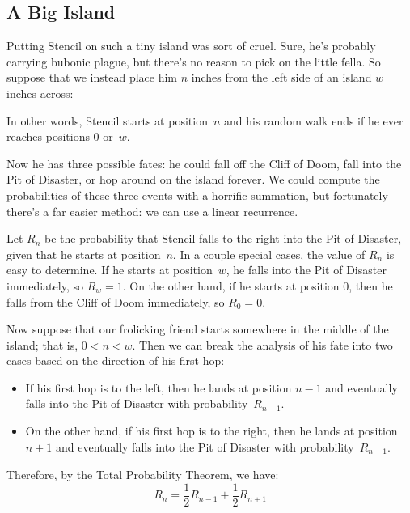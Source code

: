 \subsection{A Big Island}\label{sec:flea_analysis}

Putting Stencil on such a tiny island was sort of cruel.  Sure, he's
probably carrying bubonic plague, but there's no reason to pick on the
little fella.  So suppose that we instead place him $n$ inches from
the left side of an island $w$ inches across:
%
\begin{figure}[h]


\end{figure}
%
In other words, Stencil starts at position~$n$ and his random walk
ends if he ever reaches positions 0 or~$w$.

Now he has three possible fates: he could fall off the Cliff of Doom,
fall into the Pit of Disaster, or hop around on the island forever.
We could compute the probabilities of these three events with a
horrific summation, but fortunately there's a far easier method: we
can use a linear recurrence.

Let $R_n$ be the probability that Stencil falls to the right into the
Pit of Disaster, given that he starts at position~$n$.  In a couple
special cases, the value of $R_n$ is easy to determine.  If he starts
at position~$w$, he falls into the Pit of Disaster immediately, so
$R_w = 1$.  On the other hand, if he starts at position $0$, then he
falls from the Cliff of Doom immediately, so $R_0 = 0$.

Now suppose that our frolicking friend starts somewhere in the middle
of the island; that is, $0 < n < w$.  Then we can break the analysis
of his fate into two cases based on the direction of his first hop:
%
\begin{itemize}

\item

If his first hop is to the left, then he lands at position $n-1$ and
eventually falls into the Pit of Disaster with probability~$R_{n-1}$.

\item

On the other hand, if his first hop is to the right, then he lands at
position~$n+1$ and eventually falls into the Pit of Disaster with
probability~$R_{n+1}$.

\end{itemize}
%
Therefore, by the Total Probability Theorem, we have:
%
\[
R_n = \frac{1}{2} R_{n-1} + \frac{1}{2} R_{n+1}
\]

